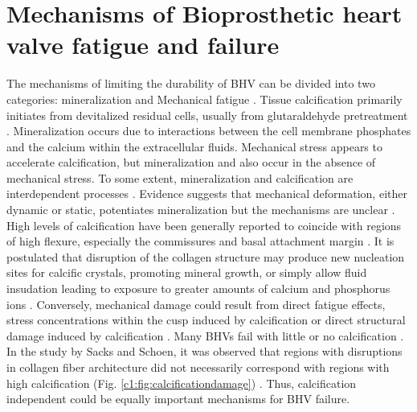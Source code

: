 \section{Mechanisms of Bioprosthetic heart valve fatigue and failure}

    The mechanisms of limiting the durability of BHV can be divided into two categories: mineralization and Mechanical fatigue \cite{schoen_tissue_1999,schoen_pathology_2001,schoen_calcification_2005}. Tissue calcification primarily initiates from devitalized residual cells, usually from glutaraldehyde pretreatment \cite{schoen_calcification_2005}. Mineralization occurs due to interactions between the cell membrane phosphates and the calcium within the extracellular fluids. Mechanical stress appears to accelerate calcification, but mineralization and also occur in the absence of mechanical stress. 
    To some extent, mineralization and calcification are interdependent processes \cite{sacks_collagen_2002}. Evidence suggests that mechanical deformation, either dynamic or static, potentiates mineralization but the mechanisms are unclear \cite{schoen_tissue_1999}. High levels of calcification have been generally reported to coincide with regions of high flexure, especially the commissures and basal attachment margin \cite{thubrikar_aortic_1990,schoen_pathology_2001}. It is postulated that disruption of the collagen structure may produce new nucleation sites for calcific crystals, promoting mineral growth, or simply allow fluid insudation leading to exposure to greater amounts of calcium and phosphorus ions \cite{schoen_tissue_1999}. Conversely, mechanical damage could result from direct fatigue effects, stress concentrations within the cusp induced by calcification or direct structural damage induced by calcification \cite{schoen_calcification_2005}. Many BHVs fail with little or no calcification \cite{schoen_tissue_1999,schoen_anatomic_1985,schoen_pathology_2001}. In the study by Sacks and Schoen, it was observed that regions with disruptions in collagen fiber architecture did not necessarily correspond with regions with high calcification (Fig. \ref{c1:fig:calcificationdamage}) \cite{sacks_collagen_2002}. Thus, calcification independent could be equally important mechanisms for BHV failure.
    
